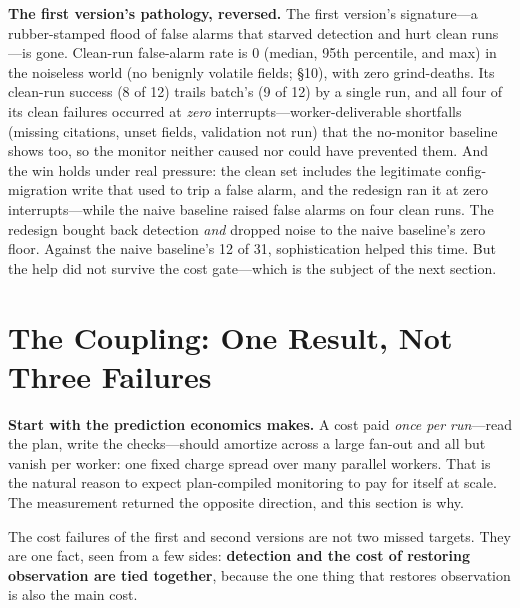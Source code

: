 \documentclass[acmsmall,screen]{acmart}
\begin{document}
\textbf{The first version's pathology, reversed.} The first version's
signature---a rubber-stamped flood of false alarms that starved detection and
hurt clean runs---is gone. Clean-run false-alarm rate is 0 (median, 95th
percentile, and max) in the noiseless world (no benignly volatile fields; \S10),
with zero grind-deaths. Its clean-run success (8 of 12)
trails batch's (9 of 12) by a single run, and all four of its clean failures
occurred at \emph{zero} interrupts---worker-deliverable shortfalls (missing
citations, unset fields, validation not run) that the no-monitor baseline shows
too, so the monitor neither caused nor could have prevented them. And the win
holds under real
pressure: the clean set includes the legitimate config-migration write that used
to trip a false alarm, and the redesign ran it at zero interrupts---while the
naive baseline raised false alarms on four clean runs. The redesign bought back
detection \emph{and} dropped noise to the naive baseline's zero floor. Against
the naive baseline's 12 of 31, sophistication helped this time. But the help did
not survive the cost gate---which is the subject of the next section.

\section{The Coupling: One Result, Not Three Failures}
\textbf{Start with the prediction economics makes.} A cost paid \emph{once per
run}---read the plan, write the checks---should amortize across a large fan-out
and all but vanish per worker: one fixed charge spread over many parallel
workers. That is the natural reason to expect plan-compiled monitoring to pay for
itself at scale. The measurement returned the opposite direction, and this
section is why.

The cost failures of the first and second versions are not two missed targets.
They are one fact, seen from a few sides: \textbf{detection and the cost of
restoring observation are tied together}, because the one thing that restores
observation is also the main cost.
\end{document}
